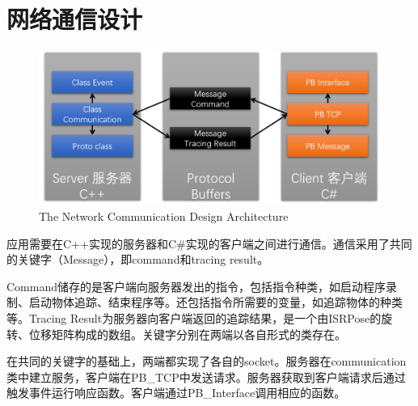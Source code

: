 \section{网络通信设计}
\begin{figure}[!htp]
  \centering
  \includegraphics[width=12cm]{figure/netarc.png}
    {The Network Communication Design Architecture}
 \label{fig:gm}
\end{figure}
应用需要在C++实现的服务器和C\#实现的客户端之间进行通信。通信采用了共同的关键字（Message），即command和tracing result。

Command储存的是客户端向服务器发出的指令，包括指令种类，如启动程序录制、启动物体追踪、结束程序等。还包括指令所需要的变量，如追踪物体的种类等。Tracing Result为服务器向客户端返回的追踪结果，是一个由ISRPose的旋转、位移矩阵构成的数组。关键字分别在两端以各自形式的类存在。

在共同的关键字的基础上，两端都实现了各自的socket。服务器在communication类中建立服务，客户端在PB\_TCP中发送请求。服务器获取到客户端请求后通过触发事件运行响应函数。客户端通过PB\_Interface调用相应的函数。
